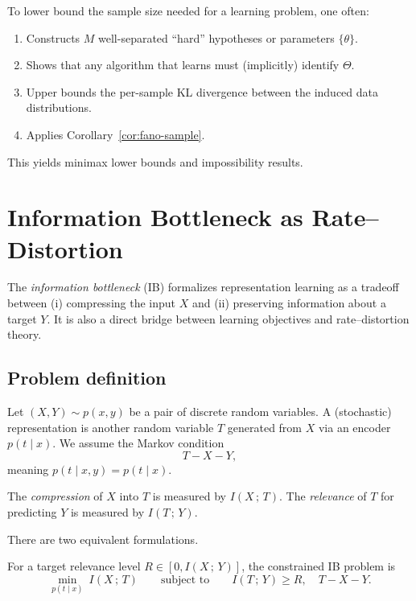 \documentclass{article}
\numberwithin{equation}{section}
\newcommand{\MI}[2]{I\!\left(#1\,;\,#2\right)}
\begin{document}
\begin{remark}
To lower bound the sample size needed for a learning problem, one often:
\begin{enumerate}[leftmargin=2em]
    \item Constructs $M$ well-separated ``hard'' hypotheses or parameters $\{\theta\}$.
    \item Shows that any algorithm that learns must (implicitly) identify $\Theta$.
    \item Upper bounds the per-sample KL divergence between the induced data distributions.
    \item Applies Corollary~\ref{cor:fano-sample}.
\end{enumerate}
This yields minimax lower bounds and impossibility results.
\end{remark}

\section{Information Bottleneck as Rate--Distortion}
\label{sec:ib}

The \emph{information bottleneck} (IB) formalizes representation learning as a tradeoff between
(i) compressing the input $X$ and (ii) preserving information about a target $Y$.
It is also a direct bridge between learning objectives and rate--distortion theory.

\subsection{Problem definition}

Let $(X,Y)\sim p(x,y)$ be a pair of discrete random variables.
A (stochastic) representation is another random variable $T$ generated from $X$ via an encoder $p(t\mid x)$.
We assume the Markov condition
\begin{equation}
    T - X - Y,
\end{equation}
meaning $p(t\mid x,y)=p(t\mid x)$.

\begin{definition}
The \emph{compression} of $X$ into $T$ is measured by $\MI{X}{T}$.
The \emph{relevance} of $T$ for predicting $Y$ is measured by $\MI{T}{Y}$.
\end{definition}

There are two equivalent formulations.

\begin{definition}
For a target relevance level $R\in[0,\MI{X}{Y}]$, the constrained IB problem is
\begin{equation}
\label{eq:ib-constrained}
    \min_{p(t\mid x)}\ \MI{X}{T}
    \qquad \text{subject to}\qquad
    \MI{T}{Y} \ge R,
    \quad T-X-Y.
\end{equation}
\end{definition}
\end{document}

